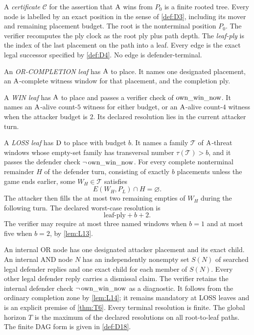\begin{definition}[Certificate]
\label{def:D9}
A \emph{certificate} $\mathcal C$ for the assertion that $\mathrm{A}$ wins from
$P_0$ is a finite rooted tree.  Every node is labelled by an exact position
in the sense of \cref{def:D3}, including its mover and remaining placement
budget.  The root is the nonterminal position $P_0$.  The verifier recomputes
the ply clock as the root ply plus path depth.  The \emph{leaf-ply} is the
index of the last placement on the path into a leaf.  Every edge is the exact
legal successor specified by \cref{def:D4}.  No edge is defender-terminal.

An \emph{OR-COMPLETION leaf} has $\mathrm{A}$ to place.  It names one designated
placement, an $\mathrm{A}$-complete witness window for that placement, and the
completion ply.

A \emph{WIN leaf} has $\mathrm{A}$ to place and passes a verifier check of
$\operatorname{own\_win\_now}$.  It names an $\mathrm{A}$-alive count-$5$ witness for either budget, or
an $\mathrm{A}$-alive count-$4$ witness when the attacker budget is $2$.  Its declared
resolution lies in the current attacker turn.

A \emph{LOSS leaf} has $\mathrm{D}$ to place with budget $b$.  It names a family
$\mathcal T$ of $\mathrm{A}$-threat windows whose empty-set family has transversal
number $\tau(\mathcal T)>b$, and it passes the defender check
$\neg\operatorname{own\_win\_now}$.  For every complete nonterminal remainder $H$ of the
defender turn, consisting of exactly $b$ placements unless the game ends
earlier, some $W_H\in\mathcal T$ satisfies
\[
  E(W_H,P_L)\cap H=\varnothing.
\]
The attacker then fills the at most two remaining empties of $W_H$ during the
following turn.  The declared worst-case resolution is
\[
  \text{leaf-ply}+b+2.
\]
The verifier may require at most three named windows when $b=1$ and at most
five when $b=2$, by \cref{lem:L13}.

An internal OR node has one designated attacker placement and its exact
child.  An internal AND node $N$ has an independently nonempty set $S(N)$ of
searched legal defender replies and one exact child for each member of
$S(N)$.  Every other legal defender reply carries a dismissal claim.  The
verifier retains the internal defender check $\neg\operatorname{own\_win\_now}$ as a diagnostic.
It follows from the ordinary completion zone by \cref{lem:L14}; it remains
mandatory at LOSS leaves and is an explicit premise of \cref{thm:T6}.  Every
terminal resolution is finite.  The global horizon $T$ is the maximum of the
declared resolutions on all root-to-leaf paths.  The finite DAG form is given
in \cref{def:D18}.
\end{definition}

